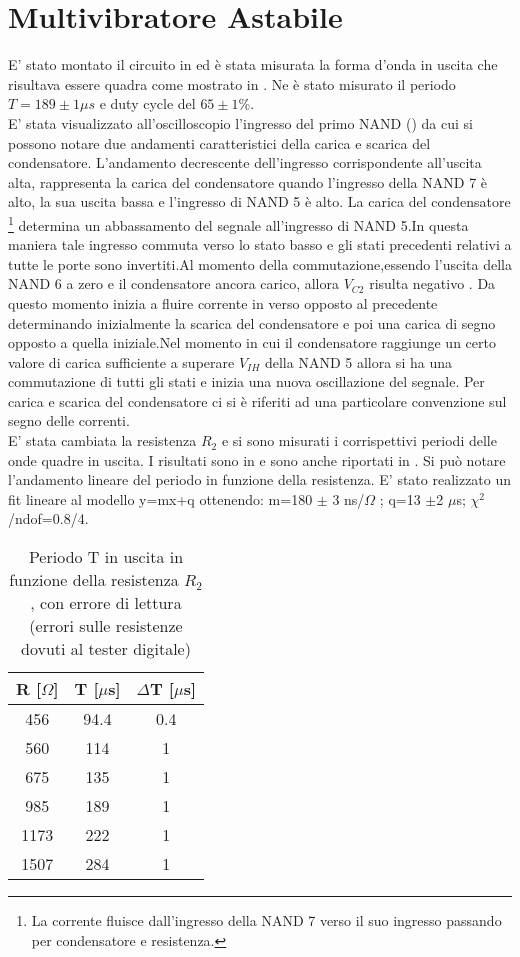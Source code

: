 \section{Multivibratore Astabile}
E' stato montato il circuito in  ed è stata misurata la forma d'onda in uscita che risultava essere quadra come mostrato in . Ne è stato misurato il periodo $T= 189 \pm 1 \mu s$ e duty cycle del  $65 \pm 1$\%. \\
E' stata visualizzato all'oscilloscopio l'ingresso del primo NAND () da cui si possono notare due andamenti caratteristici della carica e scarica del condensatore. L'andamento decrescente dell'ingresso corrispondente all'uscita alta, rappresenta la carica del condensatore quando l'ingresso della NAND 7 è alto, la sua uscita bassa e l'ingresso di NAND 5 è alto. La carica del condensatore \footnote{La corrente fluisce dall'ingresso della NAND 7 verso il suo ingresso passando per condensatore e resistenza. } determina un abbassamento del segnale all'ingresso di NAND 5.In questa maniera tale ingresso commuta verso lo stato basso e gli stati precedenti relativi a tutte le porte sono invertiti.Al momento della commutazione,essendo l'uscita della NAND 6 a zero e il condensatore ancora carico, allora $V_{C2}$ risulta negativo . Da questo momento inizia a fluire corrente in verso opposto al precedente determinando inizialmente la scarica del condensatore e poi una carica di segno opposto a quella iniziale.Nel momento in cui il condensatore raggiunge un certo valore di carica sufficiente a superare $V_{IH}$ della NAND 5 allora si ha una commutazione di tutti gli stati e inizia una nuova oscillazione del segnale. Per carica e scarica del condensatore ci si è riferiti ad una particolare convenzione sul segno delle correnti.\\
E' stata cambiata la resistenza $R_2$ e si sono misurati i corrispettivi periodi delle onde quadre in uscita. I risultati sono in  e sono anche riportati in . Si può notare l'andamento lineare del periodo in funzione della resistenza. E' stato realizzato un fit lineare al modello y=mx+q ottenendo: m=180 $\pm$ 3 ns/$\Omega$ ; q=13 $\pm$2 $\mu$s; $\chi^{2}$/ndof=0.8/4.\\
\begin{table}[h]
	\centering
	\begin{tabular}{ccc}
		{R [$\Omega$]} & {T [$\mu $s]} & {$\Delta$T [$\mu $s]} \\
		\midrule
           456 & 94.4 & 0.4\\
           560 & 114 & 1\\
           675 & 135 & 1\\
           985 & 189 & 1\\
           1173 & 222 & 1\\
           1507 & 284 & 1\\
 	\end{tabular}
	\caption{ Periodo T in uscita in funzione della resistenza $R_2$, con errore di lettura (errori sulle resistenze dovuti al tester digitale)}
	\label{t:periodo}
\end{table}
